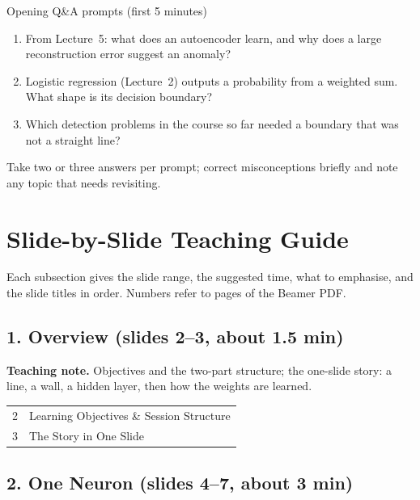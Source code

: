 \documentclass[11pt]{article}
\begin{document}
\begin{instr}{Opening Q\&A prompts (first 5 minutes)}\begin{enumerate}\item From Lecture~5: what does an autoencoder learn, and why does a large reconstruction error suggest an anomaly?\item Logistic regression (Lecture~2) outputs a probability from a weighted sum. What shape is its decision boundary?\item Which detection problems in the course so far needed a boundary that was not a straight line?\end{enumerate}Take two or three answers per prompt; correct misconceptions briefly and note any topic that needs revisiting.\end{instr}

\section{Slide-by-Slide Teaching Guide}

Each subsection gives the slide range, the suggested time, what to emphasise, and the slide titles in order. Numbers refer to pages of the Beamer PDF.

\subsection{1. Overview \normalfont\small\color{GreyN}(slides 2--3, about 1.5 min)}

\textbf{Teaching note.} Objectives and the two-part structure; the one-slide story: a line, a wall, a hidden layer, then how the weights are learned.

\begin{center}\small\renewcommand{\arraystretch}{1.1}\begin{tabularx}{\textwidth}{@{}r X@{}}2 & Learning Objectives \& Session Structure\\
3 & The Story in One Slide\\\end{tabularx}\end{center}

\subsection{2. One Neuron \normalfont\small\color{GreyN}(slides 4--7, about 3 min)}
\end{document}
